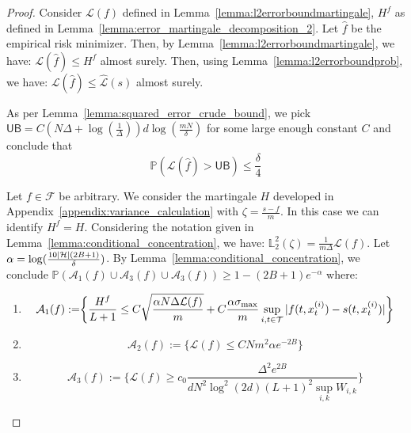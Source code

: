 \empiricalsquarederror*
\begin{proof}
Consider $\mathcal{L}(f)$ defined in Lemma~\ref{lemma:l2errorboundmartingale}, $H^f$ as defined in Lemma~\ref{lemma:error_martingale_decomposition_2}. Let $\hat{f}$ be the empirical risk minimizer. Then, by Lemma~\ref{lemma:l2errorboundmartingale}, we have: $\mathcal{L}(\hat{f}) \leq H^{\hat{f}}$ almost surely. Then, using Lemma~\ref{lemma:l2errorboundprob}, we have: $\mathcal{L}(\hat{f}) \leq \hat{\mathcal{L}}(s)$ almost surely.



As per Lemma~\ref{lemma:squared_error_crude_bound}, we pick $\mathsf{UB} = C(N\Delta + \log(\tfrac{1}{\Delta}))d\log(\tfrac{mN}{\delta})$ for some large enough constant $C$ and conclude that 
\begin{equation}\label{eq:extremity_bound}\mathbb{P}\left(\mathcal{L}(\hat{f}) > \mathsf{UB}\right) \leq \frac{\delta}{4}
\end{equation}

Let $f \in \mathcal{F}$ be arbitrary. We consider the martingale $H$ developed in Appendix~\ref{appendix:variance_calculation} with $\zeta = \frac{s-f}{m}$. In this case we can identify $H^f = H$. Considering the notation given in Lemma~\ref{lemma:conditional_concentration}, we have: $\mathbb{L}_2^{2}(\zeta) = \frac{1}{m\Delta}\mathcal{L}(f)$. Let $\alpha = \log(\tfrac{10 |\mathcal{\mathcal{H}}|(2B+1)}{\delta})$. By Lemma~\ref{lemma:conditional_concentration}, we conclude $\mathbb{P}(\mathcal{A}_1(f)\cup\mathcal{A}_3(f)\cup\mathcal{A}_3(f)) \geq 1-(2B+1)e^{-\alpha}$ where:

\begin{enumerate}
    \item $$\mathcal{A}_1(f):= \biggr\{\frac{H^f}{L+1} \leq C \sqrt{\frac{\alpha N \Delta\mathcal{L}(f)}{m}} + C\frac{\alpha \sigma_{\max}}{m} \sup_{i,t\in \mathcal{T}}|f(t,x_t^{(i)})-s(t,x_t^{(i)})|\biggr\}$$
    \item $$\mathcal{A}_2(f) := \bigr\{\mathcal{L}(f) \leq CNm^2\alpha e^{-2B}\bigr\}$$
    \item $$\mathcal{A}_3(f) := \biggr\{\mathcal{L}(f) \geq c_0\frac{\Delta^2 e^{2B}}{d N^2 \log^2(2d)(L+1)^2\sup_{i,k}W_{i,k}}\biggr\}$$
\end{enumerate}


\end{proof}

